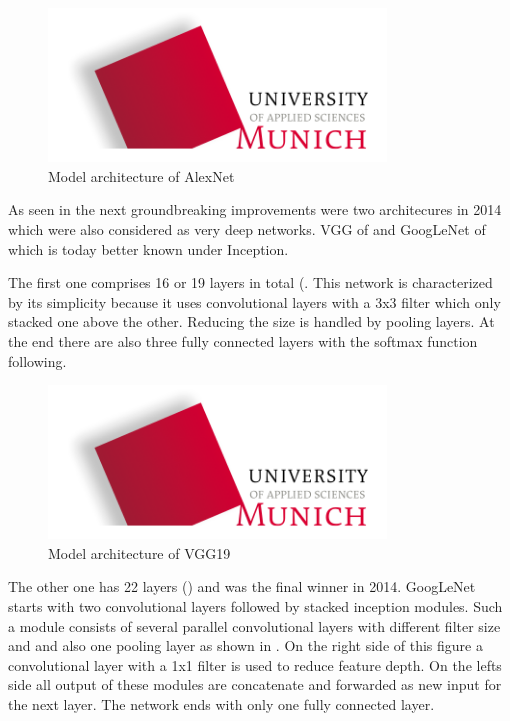 \begin{figure}[htbp]
\includegraphics[width=0.8\textwidth]{includes/MUASlogo}
\caption[Model architecture of AlexNet]{Model architecture of AlexNet \citep{He2016}}
\label{fig:FH-Logo2}
\end{figure}

As seen in  the next groundbreaking improvements were two architecures in 2014 which were also considered as very deep networks. VGG of \citet{Simonyan2015} and GoogLeNet of \citet{Szegedy2014} which is today better known under \glq Inception\grq. 

The first one comprises 16 or 19 layers in total (. This network is characterized by its simplicity because it uses convolutional layers with a 3x3 filter which only stacked one above the other. Reducing the size is handled by pooling layers. At the end there are also three fully connected layers with the softmax function following.

\begin{figure}[htbp]
\includegraphics[width=0.8\textwidth]{includes/MUASlogo}
\caption[Model architecture of VGG19]{Model architecture of VGG19 \citep{He2016}}
\label{fig:FH-Logo3}
\end{figure}

The other one has 22 layers () and was the final winner in 2014. GoogLeNet starts with two convolutional layers followed by stacked inception modules. Such a module consists of several parallel convolutional layers with different filter size and and also one pooling layer as shown in . On the right side of this figure a convolutional layer with a 1x1 filter is used to reduce feature depth. On the lefts side all output of these modules are concatenate and forwarded as new input for the next layer. The network ends with only one fully connected layer.

